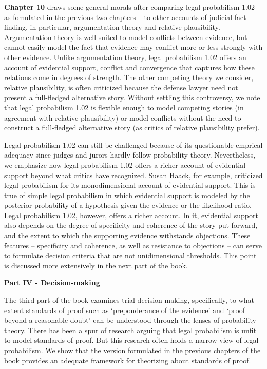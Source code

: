 \documentclass[10pt,dvipsnames,enabledeprecatedfontcommands]{scrartcl}
\begin{document}
\textbf{Chapter 10} draws some general morals after comparing legal
probabilism 1.02 -- as fomulated in the previous two chapters -- to
other accounts of judicial fact-finding, in particular, argumentation
theory and relative plausibility. Argumentation theory is well suited to
model conflicts between evidence, but cannot easily model the fact that
evidence may conflict more or less strongly with other evidence. Unlike
argumentation theory, legal probabilism 1.02 offers an account of
evidential support, conflict and convergence that captures how these
relations come in degrees of strength. The other competing theory we
consider, relative plausibility, is often criticized because the defense
lawyer need not present a full-fledged alternative story. Without
settling this controversy, we note that legal probabilism 1.02 is
flexible enough to model competing stories (in agreement with relative
plausibility) or model conflicts without the need to construct a
full-fledged alternative story (as critics of relative plausibility
prefer).

Legal probabilism 1.02 can still be challenged because of its
questionable emprical adequacy since judges and jurors hardly follow
probability theory. Nevertheless, we emphasize how legal probabilism
1.02 offers a richer account of evidential support beyond what critics
have recognized. Susan Haack, for example, criticized legal probabilism
for its monodimensional account of evidential support. This is true of
simple legal probabilism in which evidential support is modeled by the
posterior probability of a hypothesis given the evidence or the
likelihood ratio. Legal probabilism 1.02, however, offers a richer
account. In it, evidential support also depends on the degree of
specificity and coherence of the story put forward, and the extent to
which the supporting evidence withstands objections. These features --
specificity and coherence, as well as resistance to objections -- can
serve to formulate decision criteria that are not unidimensional
thresholds. This point is discussed more extensively in the next part of
the book.

\vspace{3mm} \noindent
\textbf{Part IV - Decision-making}

\noindent
The third part of the book examines trial decision-making, specifically,
to what extent standards of proof such as `preponderance of the
evidence' and `proof beyond a reasonable doubt' can be understood
through the lenses of probability theory. There has been a spur of
research arguing that legal probabilism is unfit to model standards of
proof. But this research often holds a narrow view of legal probabilism.
We show that the version formulated in the previous chapters of the book
provides an adequate framework for theorizing about standards of proof.
\end{document}
